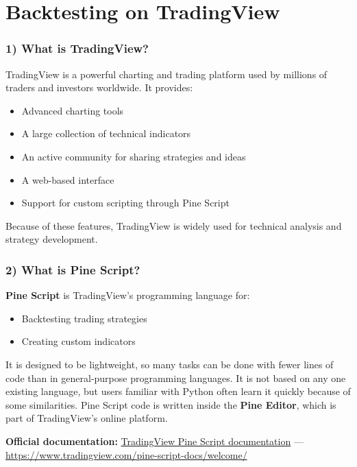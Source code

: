 \documentclass[12pt,openany]{book}
\begin{document}
\section{Backtesting on TradingView}

\subsubsection{1) What is TradingView?}

TradingView is a powerful charting and trading platform used by millions of traders and investors worldwide. It provides:

\begin{itemize}[leftmargin=*]
    \item Advanced charting tools
    \item A large collection of technical indicators
    \item An active community for sharing strategies and ideas
    \item A web-based interface
    \item Support for custom scripting through Pine Script
\end{itemize}

Because of these features, TradingView is widely used for technical analysis and strategy development.

\subsubsection{2) What is Pine Script?}

\textbf{Pine Script} is TradingView's programming language for:

\begin{itemize}[leftmargin=*]
    \item Backtesting trading strategies
    \item Creating custom indicators
\end{itemize}

It is designed to be lightweight, so many tasks can be done with fewer lines of code than in general-purpose programming languages. It is not based on any one existing language, but users familiar with Python often learn it quickly because of some similarities. Pine Script code is written inside the \textbf{Pine Editor}, which is part of TradingView's online platform.

\textbf{Official documentation:} \href{https://www.tradingview.com/pine-script-docs/welcome/}{TradingView Pine Script documentation} --- \url{https://www.tradingview.com/pine-script-docs/welcome/}
\end{document}
